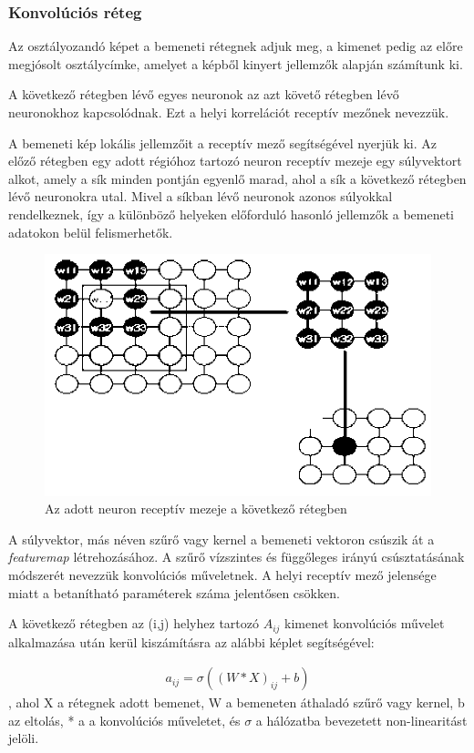 \documentclass[12pt,a4]{article}
\begin{document}
	
	\subsubsection{Konvolúciós réteg}
	
	Az osztályozandó képet a bemeneti rétegnek adjuk meg, a kimenet pedig az előre megjósolt osztálycímke, amelyet a képből kinyert jellemzők alapján számítunk ki.
	
	
	A következő rétegben lévő egyes neuronok az azt követő rétegben lévő neuronokhoz kapcsolódnak. Ezt a helyi korrelációt receptív mezőnek nevezzük.
	
	
	A bemeneti kép lokális jellemzőit a receptív mező segítségével nyerjük ki. Az előző rétegben egy adott régióhoz tartozó neuron receptív mezeje egy súlyvektort alkot, amely a sík minden pontján egyenlő marad, ahol a sík a következő rétegben lévő neuronokra utal. Mivel a síkban lévő neuronok azonos súlyokkal rendelkeznek, így a különböző helyeken előforduló hasonló jellemzők a bemeneti adatokon belül felismerhetők.
	
	\begin{figure}[h]	
		\centering
		\includegraphics[width=0.7\linewidth]{receptiv}
		\caption{\cite{CNN} Az adott neuron receptív mezeje a következő rétegben}
	\end{figure}
		\newpage
	A súlyvektor, más néven szűrő vagy kernel a bemeneti vektoron csúszik át a \textit{featuremap} létrehozásához.
	A szűrő vízszintes és függőleges irányú csúsztatásának módszerét nevezzük konvolúciós műveletnek. A helyi receptív mező jelensége miatt a betanítható paraméterek száma jelentősen csökken.
	
	A következő rétegben az (i,j) helyhez tartozó $A_{ij}$ kimenet konvolúciós
	művelet alkalmazása után kerül kiszámításra az alábbi képlet segítségével:
	\begin{mdframed}
	\begin{align}
		a_{ij} = \sigma((W * X)_{ij} + b)
	\end{align}
	, ahol X a rétegnek adott bemenet, W a bemeneten áthaladó szűrő vagy kernel,
	b az eltolás, * a 
	a konvolúciós műveletet, és $\sigma$ a hálózatba bevezetett non-linearitást jelöli.
	\end{mdframed}
	
\end{document}
